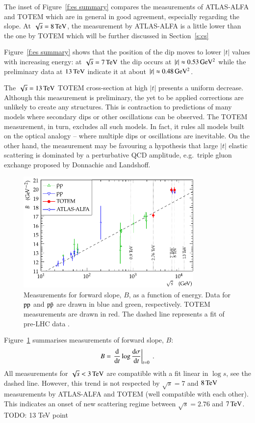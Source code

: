 \documentclass{webofc}
\def\un#1{\,{\rm #1}}
\def\d{{\rm d}}
\begin{document}
The inset of Figure~\ref{f:es summary} compares the measurements of ATLAS-ALFA and TOTEM which are in general in good agreement, especially regarding the slope. At $\sqrt s = 8\un{TeV}$, the measurement by ATLAS-ALFA is a little lower than the one by TOTEM which will be further discussed in Section~\ref{s:cs}

Figure~\ref{f:es summary} shows that the position of the dip moves to lower $|t|$ values with increasing energy: at $\sqrt s = 7\un{TeV}$ the dip occurs at $|t| \approx 0.53\un{GeV^2}$ while the preliminary data at $13\un{TeV}$ indicate it at about $|t| \approx 0.48\un{GeV^2}$.

The $\sqrt s = 13\un{TeV}$ TOTEM cross-section at high $|t|$ presents a uniform decrease. Although this measurement is preliminary, the yet to be applied corrections are unlikely to create any structures. This is contraction to predictions of many models where secondary dips or other oscillations can be observed. The TOTEM measurement, in turn, excludes all such models. In fact, it rules all models built on the optical analogy -- where multiple dips or oscillations are inevitable. On the other hand, the measurement may be favouring a hypothesis that large $|t|$ elastic scattering is dominated by a perturbative QCD amplitude, e.g.~triple gluon exchange proposed by Donnachie and Landshoff.

\begin{figure}[h]
\centering
\includegraphics[height=6cm,clip]{fig/es_B_vs_s.pdf}
\vskip-4mm
\caption{Measurements for forward slope, $B$, as a function of energy. Data for $\rm pp$ and $\rm p\bar p$ are drawn in blue and green, respectively. TOTEM measurements are drawn in red. The dashed line represents a fit of pre-LHC data \cite{b-vs-s-data}.}
\label{f:es B}
\end{figure}


Figure~\ref{f:es B} summarises measurements of forward slope, $B$:
\begin{equation}
B = \left. {\d\over \d t} \log {\d\sigma\over \d t} \right|_{t = 0}\ .
\end{equation}
All measurements for $\sqrt s < 3\un{TeV}$ are compatible with a fit linear in $\log s$, see the dashed line. However, this trend is not respected by $\sqrt s = 7$ and $8\un{TeV}$ measurements by ATLAS-ALFA \cite{alfa-si-el-7tev,alfa-si-el-8tev} and TOTEM \cite{totem-si-el-7tev,totem-si-8tev} (well compatible with each other). This indicates an onset of new scattering regime between $\sqrt s = 2.76$ and $7\un{TeV}$. TODO: 13 TeV point
\end{document}
